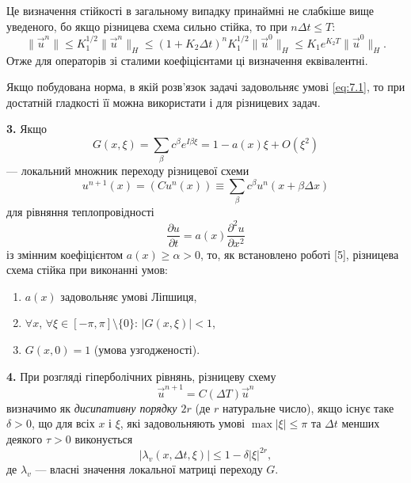 \begin{remark}
    Це визначення стійкості в загальному випадку принаймні не слабкіше вище уведеного, бо якщо різницева схема сильно стійка, то при $n \Delta t \le T$:
    \begin{equation*}
        \|\vec u^n\| \le K_1^{1/2} \|\vec u^n\|_H \le (1 + K_2 \Delta t)^n K_1^{1/2} \|\vec u^0\|_H \le K_1 e^{K_2 T} \|\vec u^0\|_H.
    \end{equation*}
    Отже для операторів зі сталими коефіцієнтами ці визначення еквівалентні.
\end{remark}

Якщо побудована норма, в якій розв'язок задачі задовольняє умові \eqref{eq:7.1}, то при достатній гладкості її можна використати і для різницевих задач. \medskip

\textbf{3.} Якщо 
\begin{equation*}
    G(x, \xi) = \sum_\beta c^\beta e^{I \beta \xi} = 1 - a(x) \xi + O(\xi^2)
\end{equation*} 
--- локальний множник переходу різницевої схеми 
\begin{equation*}
    u^{n + 1}(x) = (C u^n(x)) \equiv \sum_\beta c^\beta u^n (x + \beta \Delta x)
\end{equation*}
для рівняння теплопровідності 
\begin{equation*}
    \frac{\partial u}{\partial t} = a(x) \frac{\partial^2 u}{\partial x^2}
\end{equation*}
із змінним коефіцієнтом $a(x) \ge \alpha > 0$, то, як встановлено роботі [5], різницева схема стійка при виконанні умов: 
\begin{enumerate}
    \item $a(x)$ задовольняє умові Ліпшиця,
    \item $\forall x$, $\forall \xi \in [-\pi, \pi] \setminus \{0\}$: $|G(x, \xi)| < 1$,
    \item $G(x, 0) = 1$ (умова узгодженості).
\end{enumerate}

\textbf{4.} При розгляді гіперболічних рівнянь, різницеву схему 
\begin{equation}
    \label{eq:7.2}
    \vec u^{n + 1} = C(\Delta T) \vec u^n
\end{equation}
визначимо як \textit{дисипативну порядку $2r$} (де $r$ натуральне число), якщо існує таке $\delta > 0$, що для всіх $x$ і $\xi$, які задовольняють умові $\max|\xi| \le \pi$  та $\Delta t$ менших деякого $\tau > 0$ виконується
\begin{equation*}
    |\lambda_v(x, \Delta t, \xi)| \le 1 - \delta |\xi|^{2r},
\end{equation*}
де $\lambda_v$ --- власні значення локальної матриці переходу $G$.

